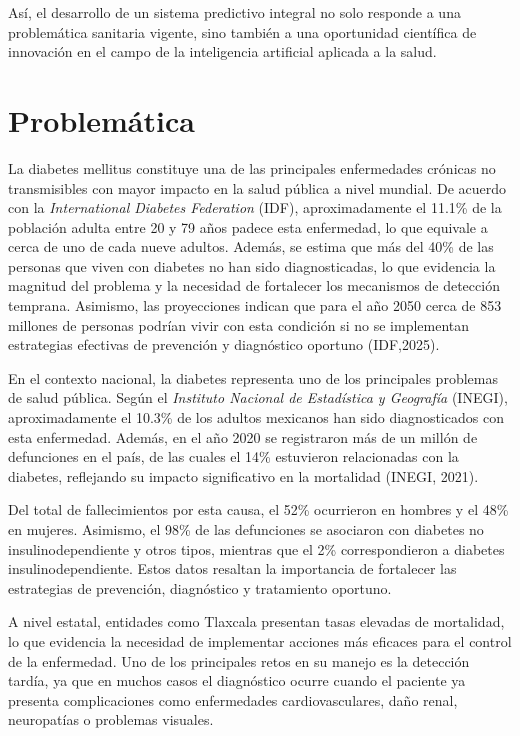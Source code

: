 As\'i, el desarrollo de un sistema predictivo integral no solo responde a una problem\'atica sanitaria vigente, sino tambi\'en a una oportunidad cient\'ifica de innovaci\'on en el campo de la inteligencia artificial aplicada a la salud.

\section{Problem\'atica}

La diabetes mellitus constituye una de las principales enfermedades cr\'onicas no transmisibles con mayor impacto en la salud p\'ublica a nivel mundial. De acuerdo con la \textit{International Diabetes Federation} (IDF), aproximadamente el 11.1\% de la poblaci\'on adulta entre 20 y 79 a\~nos padece esta enfermedad, lo que equivale a cerca de uno de cada nueve adultos. Adem\'as, se estima que m\'as del 40\% de las personas que viven con diabetes no han sido diagnosticadas, lo que evidencia la magnitud del problema y la necesidad de fortalecer los mecanismos de detecci\'on temprana. Asimismo, las proyecciones indican que para el a\~no 2050 cerca de 853 millones de personas podr\'ian vivir con esta condici\'on si no se implementan estrategias efectivas de prevenci\'on y diagn\'ostico oportuno (IDF,2025).

En el contexto nacional, la diabetes representa uno de los principales problemas de salud p\'ublica. Seg\'un el \textit{ Instituto Nacional de Estad\'istica y Geograf\'ia} (INEGI), aproximadamente el 10.3\% de los adultos mexicanos han sido diagnosticados con esta enfermedad. Adem\'as, en el a\~no 2020 se registraron m\'as de un mill\'on de defunciones en el pa\'is, de las cuales el 14\% estuvieron relacionadas con la diabetes, reflejando su impacto significativo en la mortalidad (INEGI, 2021).

Del total de fallecimientos por esta causa, el 52\% ocurrieron en hombres y el 48\% en mujeres. Asimismo, el 98\% de las defunciones se asociaron con diabetes no insulinodependiente y otros tipos, mientras que el 2\% correspondieron a diabetes insulinodependiente. Estos datos resaltan la importancia de fortalecer las estrategias de prevenci\'on, diagn\'ostico y tratamiento oportuno.

A nivel estatal, entidades como Tlaxcala presentan tasas elevadas de mortalidad, lo que evidencia la necesidad de implementar acciones m\'as eficaces para el control de la enfermedad. Uno de los principales retos en su manejo es la detecci\'on tard\'ia, ya que en muchos casos el diagn\'ostico ocurre cuando el paciente ya presenta complicaciones como enfermedades cardiovasculares, da\~no renal, neuropat\'ias o problemas visuales.

